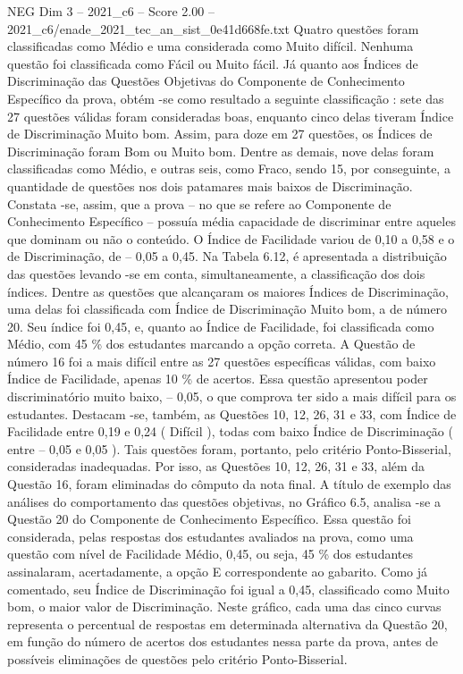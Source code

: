 \begin{textsample}{NEG Dim 3 – 2021\_c6 – Score 2.00 – 2021\_c6/enade\_2021\_tec\_an\_sist\_0e41d668fe.txt}
Quatro questões foram classificadas como Médio e uma considerada como Muito difícil.
Nenhuma questão foi classificada como Fácil ou Muito fácil.
Já quanto aos Índices de Discriminação das Questões Objetivas do Componente de Conhecimento Específico da prova, obtém -se como resultado a seguinte classificação : sete das 27 questões válidas foram consideradas boas, enquanto cinco delas tiveram Índice de Discriminação Muito bom.
Assim, para doze em 27 questões, os Índices de Discriminação foram Bom ou Muito bom.
Dentre as demais, nove delas foram classificadas como Médio, e outras seis, como Fraco, sendo 15, por conseguinte, a quantidade de questões nos dois patamares mais baixos de Discriminação.
Constata -se, assim, que a prova – no que se refere ao Componente de Conhecimento Específico – possuía média capacidade de discriminar entre aqueles que dominam ou não o conteúdo.
O Índice de Facilidade variou de 0,10 a 0,58 e o de Discriminação, de – 0,05 a 0,45.
Na Tabela 6.12, é apresentada a distribuição das questões levando -se em conta, simultaneamente, a classificação dos dois índices.
Dentre as questões que alcançaram os maiores Índices de Discriminação, uma delas foi classificada com Índice de Discriminação Muito bom, a de número 20.
Seu índice foi 0,45, e, quanto ao Índice de Facilidade, foi classificada como Médio, com 45 \% dos estudantes marcando a opção correta.
A Questão de número 16 foi a mais difícil entre as 27 questões específicas válidas, com baixo Índice de Facilidade, apenas 10 \% de acertos.
Essa questão apresentou poder discriminatório muito baixo, – 0,05, o que comprova ter sido a mais difícil para os estudantes.
Destacam -se, também, as Questões 10, 12, 26, 31 e 33, com Índice de Facilidade entre 0,19 e 0,24 ( Difícil ), todas com baixo Índice de Discriminação ( entre – 0,05 e 0,05 ).
Tais questões foram, portanto, pelo critério Ponto-Bisserial, consideradas inadequadas.
Por isso, as Questões 10, 12, 26, 31 e 33, além da Questão 16, foram eliminadas do cômputo da nota final.
A título de exemplo das análises do comportamento das questões objetivas, no Gráfico 6.5, analisa -se a Questão 20 do Componente de Conhecimento Específico.
Essa questão foi considerada, pelas respostas dos estudantes avaliados na prova, como uma questão com nível de Facilidade Médio, 0,45, ou seja, 45 \% dos estudantes assinalaram, acertadamente, a opção E correspondente ao gabarito.
Como já comentado, seu Índice de Discriminação foi igual a 0,45, classificado como Muito bom, o maior valor de Discriminação.
Neste gráfico, cada uma das cinco curvas representa o percentual de respostas em determinada alternativa da Questão 20, em função do número de acertos dos estudantes nessa parte da prova, antes de possíveis eliminações de questões pelo critério Ponto-Bisserial.

\end{textsample}
